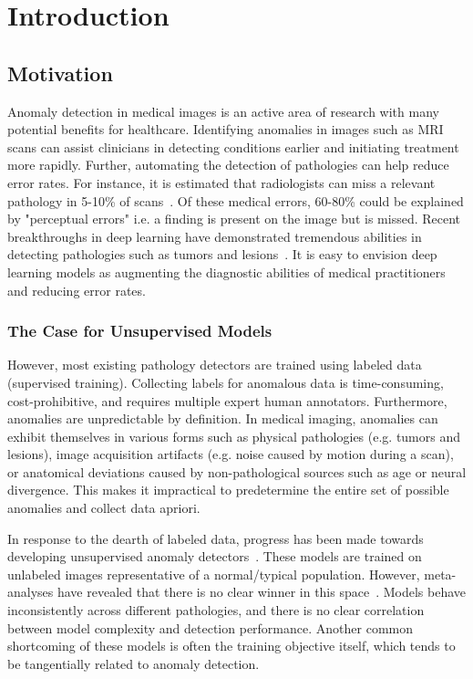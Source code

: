 \chapter{Introduction}

\section{Motivation}

Anomaly detection in medical images is an active area of research with many potential benefits for healthcare. Identifying anomalies in images such as MRI scans can assist clinicians in detecting conditions earlier and initiating treatment more rapidly. Further, automating the detection of pathologies can help reduce error rates. For instance, it is estimated that radiologists can miss a relevant pathology in 5-10\% of scans~\cite{bruno_understanding_2015}. Of these medical errors, 60-80\% could be explained by "perceptual errors" i.e. a finding is present on the image but is missed. Recent breakthroughs in deep learning have demonstrated tremendous abilities in detecting pathologies such as tumors and lesions~\cite{kim_deep_2019,lee_deep_2017}. It is easy to envision deep learning models as augmenting the diagnostic abilities of medical practitioners and reducing error rates. 


\subsection*{The Case for Unsupervised Models}

However, most existing pathology detectors are trained using labeled data (supervised training). Collecting labels for anomalous data is time-consuming, cost-prohibitive, and requires multiple expert human annotators.  Furthermore, anomalies are unpredictable by definition. In medical imaging, anomalies can exhibit themselves in various forms such as physical pathologies (e.g. tumors and lesions), image acquisition artifacts (e.g. noise caused by motion during a scan), or anatomical deviations caused by non-pathological sources such as age or neural divergence.
This makes it impractical to predetermine the entire set of possible anomalies and collect data apriori.

In response to the dearth of labeled data, progress has been made towards developing unsupervised anomaly detectors~\cite{bergmann2020uninformed,baur_deep_2019,ruff_unifying_2021}. These models are trained on unlabeled images representative of a normal/typical population.
However, meta-analyses have revealed that there is no clear winner in this space~\cite{baur2021,ruff_unifying_2021}. Models behave inconsistently across different pathologies, and there is no clear correlation between model complexity and detection performance. Another common shortcoming of these models is often the training objective itself, which tends to be tangentially related to anomaly detection.

